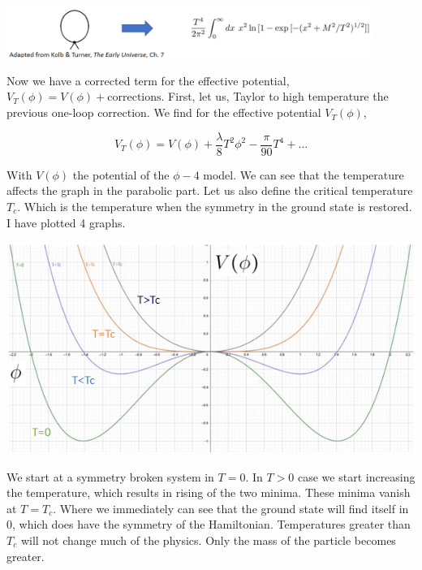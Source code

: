 \documentclass{article}
\numberwithin{equation}{section}
\begin{document}
\begin{center}
\includegraphics[width=450px]{Knipsel4.PNG}    
\end{center}

Now we have a corrected term for the effective potential, $V_T(\phi)=V(\phi)+\text{corrections}$.
First, let us, Taylor to high temperature the previous one-loop correction.
We find for the effective potential $V_T(\phi)$,

\begin{equation}
    V_T(\phi)=V(\phi)+\frac{\lambda}{8}T^2\phi^2-\frac{\pi}{90}T^4+\dots
\end{equation}

With $V(\phi)$ the potential of the $\phi-4$ model.
We can see that the temperature affects the graph in the parabolic part.
Let us also define the critical temperature $T_c$. 
Which is the temperature when the symmetry in the ground state is restored.
I have plotted 4 graphs.


\begin{center}
    
\includegraphics[]{graphTrestoration.PNG}

\end{center}

We start at a symmetry broken system in $T=0$. In $T>0$ case we start increasing the temperature, which results in rising of the two minima.
These minima vanish at $T=T_c$.
Where we immediately can see that the ground state will find itself in 0, which does have the symmetry of the Hamiltonian.
Temperatures greater than $T_c$ will not change much of the physics. 
Only the mass of the particle becomes greater.
\end{document}
